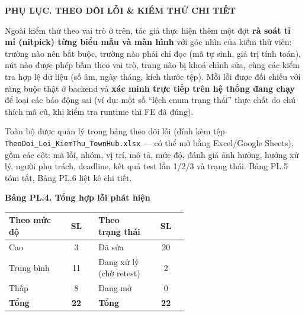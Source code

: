 \clearpage
{}
{}

\begin{center}\textbf{\large PHỤ LỤC. THEO DÕI LỖI \& KIỂM THỬ CHI TIẾT}\end{center}
\smallskip

Ngoài kiểm thử theo vai trò ở trên, tác giả thực hiện thêm một đợt \textbf{rà soát tỉ mỉ (nitpick) từng biểu mẫu và màn hình} với góc nhìn của kiểm thử viên: trường nào nên bắt buộc, trường nào phải chỉ đọc (mã tự sinh, giá trị tính toán), nút nào được phép bấm theo vai trò, trang nào bị khoá chỉnh sửa, cùng các kiểm tra hợp lệ dữ liệu (số âm, ngày tháng, kích thước tệp). Mỗi lỗi được đối chiếu với ràng buộc thật ở backend và \textbf{xác minh trực tiếp trên hệ thống đang chạy} để loại các báo động sai (ví dụ: một số ``lệch enum trạng thái'' thực chất do chú thích mã cũ, khi kiểm tra runtime thì FE đã đúng).

Toàn bộ được quản lý trong bảng theo dõi lỗi (đính kèm tệp \texttt{TheoDoi\_Loi\_KiemThu\_TownHub.xlsx} — có thể mở bằng Excel/Google Sheets), gồm các cột: mã lỗi, nhóm, vị trí, mô tả, mức độ, đánh giá ảnh hưởng, hướng xử lý, người phụ trách, deadline, kết quả test lần 1/2/3 và trạng thái. Bảng PL.5 tóm tắt, Bảng PL.6 liệt kê chi tiết.

\medskip
\textbf{Bảng PL.4. Tổng hợp lỗi phát hiện}

\begin{center}{\small\renewcommand{\arraystretch}{1.2}
\begin{tabular}{|>{\raggedright\arraybackslash}p{0.30\linewidth}|c||>{\raggedright\arraybackslash}p{0.30\linewidth}|c|}
\hline
\rowcolor{gray!15}\textbf{Theo mức độ} & \textbf{SL} & \textbf{Theo trạng thái} & \textbf{SL} \\ \hline
Cao & 3 & Đã sửa & 20 \\ \hline
Trung bình & 11 & Đang xử lý (chờ retest) & 2 \\ \hline
Thấp & 8 & Đang mở & 0 \\ \hline
\rowcolor{gray!15}\textbf{Tổng} & \textbf{22} & \textbf{Tổng} & \textbf{22} \\ \hline
\end{tabular}}\end{center}

